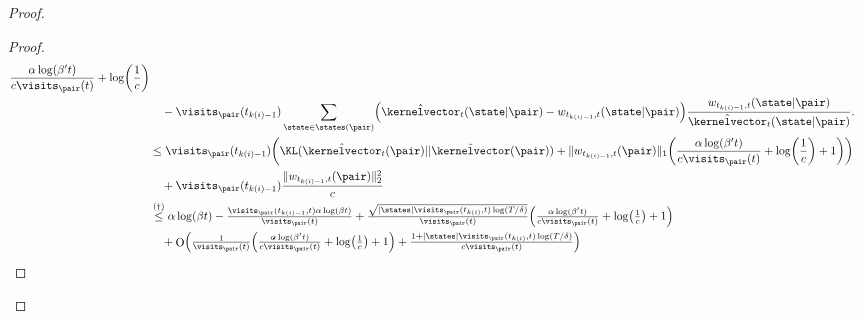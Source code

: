 \documentclass[preprint,cleveref,12pt]{colt2025}
\DeclarePairedDelimiter{\parens}{(}{)}	%
\DeclarePairedDelimiter{\abs}{\lvert}{\rvert}	%
\DeclarePairedDelimiter{\norm}{\lVert}{\rVert}	%
\DeclareMathOperator*{\OH}{\mathrm{O}}
\def\kernel{\kernelvector}
\begin{document}
\begin{proof}
\begin{proof}
\begin{align*}
{{                        \frac{
                            \alpha \log(\beta't)
                        }{c \visits_\pair (t)}
                        +
                        \log \parens*{\frac 1c}
                    }
                }
                \\
                & \quad -
                \visits_{\pair} (t_{k(i)-1}) 
                \sum_{\state \in \states(\pair)}
                \parens*{
                    \hat{\kernel}_t(\state|\pair) - w_{t_{k(i)-1}, t}(\state|\pair)
                }
                \frac
                { w_{t_{k(i)-1}, t}(\state|\pair) }
                { \hat{\kernel}_t(\state|\pair) }
                .
                \\
                & \le 
                \visits_\pair (t_{k(i)-1}) \parens*{
                    \KL(\hat{\kernel}_{t}(\pair) || \tilde{\kernel}(\pair))
                    +
                    \norm{w_{t_{k(i)-1}, t}(\pair)}_1 \parens*{
                        \frac{
                            \alpha \log(\beta't)
                        }{c \visits_\pair (t)}
                        +
                        \log \parens*{\frac 1c}
                        +
                        1
                    }
                }
                \\
                & \quad
                +
                \visits_\pair (t_{k(i)-1})
                \frac{\norm{w_{t_{k(i)-1},t}(\pair)}_2^2}{c}
                \\
                & \overset{(\dagger)}\le
                \alpha \log(\beta t)
                - \tfrac{\visits_\pair(t_{k(i)-1}, t) \alpha \log(\beta t)}{\visits_\pair (t)}
                + \tfrac{\sqrt{\abs{\states} \visits_\pair(t_{k(i)}, t) \log\parens*{T/\delta}}}{\visits_\pair(t)}
                \parens*{
                    \tfrac{
                        \alpha \log(\beta't)
                    }{c \visits_\pair (t)}
                    +
                    \log \parens*{\tfrac 1c}
                    +
                    1
                }
                \\
                & \quad + \OH \parens*{
                    \tfrac 1{\visits_\pair (t)}
                    \parens*{
                        \tfrac{
                            \alpha \log(\beta't)
                        }{c \visits_\pair (t)}
                        +
                        \log \parens*{\tfrac 1c}
                        +
                        1
                    }
                    +
                    \tfrac{1 + \abs{\states} \visits_\pair(t_{k(i)}, t) \log(T/\delta)}{c \visits_\pair(t)}
}
\end{align*}
\end{proof}
\end{proof}
\end{document}
